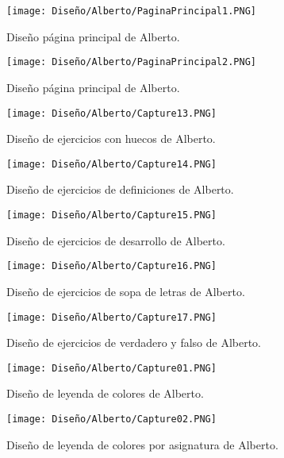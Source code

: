 \begin{figure}[ht!]
  \centering
  \texttt{[image: Diseño/Alberto/PaginaPrincipal1.PNG]}
  \caption{Diseño página principal de Alberto.}
  \label{AlbertoPaginaPrincipal1}
\end{figure}

\begin{figure}[ht!]
  \centering
  \texttt{[image: Diseño/Alberto/PaginaPrincipal2.PNG]}
  \caption{Diseño página principal de Alberto.}
  \label{AlbertoPaginaPrincipal2}
\end{figure}


\begin{figure}[ht!]
  \centering
  \texttt{[image: Diseño/Alberto/Capture13.PNG]}
  \caption{Diseño de ejercicios con huecos de Alberto.}
  \label{Alberto13}
\end{figure}

\begin{figure}[ht!]
  \centering
  \texttt{[image: Diseño/Alberto/Capture14.PNG]}
  \caption{Diseño de ejercicios de definiciones de Alberto.}
  \label{Alberto14}
\end{figure}

\begin{figure}[ht!]
  \centering
  \texttt{[image: Diseño/Alberto/Capture15.PNG]}
  \caption{Diseño de ejercicios de desarrollo de Alberto.}
  \label{Alberto15}
\end{figure}

\begin{figure}[ht!]
  \centering
  \texttt{[image: Diseño/Alberto/Capture16.PNG]}
  \caption{Diseño de ejercicios de sopa de letras de Alberto.}
  \label{Alberto16}
\end{figure}

\begin{figure}[ht!]
  \centering
  \texttt{[image: Diseño/Alberto/Capture17.PNG]}
  \caption{Diseño de ejercicios de verdadero y falso de Alberto.}
  \label{Alberto17}
\end{figure}


\begin{figure}[ht!]
  \centering
  \texttt{[image: Diseño/Alberto/Capture01.PNG]}
  \caption{Diseño de leyenda de colores de Alberto.}
  \label{Alberto1}
\end{figure}

\begin{figure}[ht!]
  \centering
  \texttt{[image: Diseño/Alberto/Capture02.PNG]}
  \caption{Diseño de leyenda de colores por asignatura de Alberto.}
  \label{Alberto2}
\end{figure}

